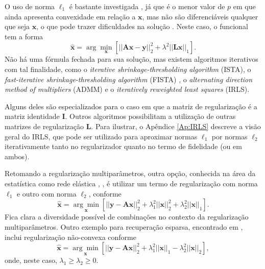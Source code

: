 O uso de norma $\ell_1$ é bastante investigada \cite[pág. 181]{aster2019parameter}, já que é o menor valor de $p$ em que ainda apresenta convexidade em relação a $\mathbf{x}$, mas não são diferenciáveis qualquer que seja $\mathbf{x}$, o que pode trazer dificuldades na solução \cite[pág. 46]{aster2019parameter}. Neste caso, o funcional tem a forma 
\begin{equation}
\hat{\mathbf{x}} = \arg\min\limits_{\mathbf{x}} \left[ \vert \vert \mathbf{A} \mathbf{x} - \mathbf{y} \vert \vert^2_2 + \lambda^2 \vert \vert \mathbf{L} \mathbf{x} \vert \vert_1 \right].
\label{eq:norma1}
\end{equation}
Não há uma fórmula fechada para sua solução, mas existem algoritmos iterativos com tal finalidade, como o \textit{iterative shrinkage-thresholding algorithm} (ISTA), o \textit{fast-iterative shrinkage-thresholding algorithm} (FISTA)   \cite{Daubechies2016}, o \textit{alternating direction method of multipliers} (ADMM) \cite[págs. 196-201]{aster2019parameter} e o \textit{iteratively reweighted least squares} (IRLS).

Alguns deles são especializados para o caso em que a matriz de regularização é a matriz identidade $\mathbf{I}$. Outros algoritmos possibilitam a utilização de outras matrizes de regularização $\mathbf{L}$. Para ilustrar, o Apêndice \ref{Ap:IRLS} descreve a visão geral do IRLS, que pode ser utilizado para aproximar normas $\ell_1$ por normas $\ell_2$ iterativamente tanto no regularizador quanto no termo de fidelidade (ou em ambos). 

Retomando a regularização multiparâmetros, outra opção, conhecida na área da estatística como rede elástica \cite[pág. 213]{majumdar2019compressed}, \cite{zou2005}, é utilizar um termo de regularização com norma $\ell_1$ e outro com norma $\ell_2$, conforme 
\begin{equation}
\hat{\mathbf{x}} = \underset{\mathbf{x}}{\arg\min}\left[ \vert \vert \mathbf{y} - \mathbf{A}\mathbf{x} \vert \vert^2_2+\lambda_{1}^2 \vert\vert \mathbf{x} \vert\vert^{2}_2+\lambda _{2}^2 \vert \vert \mathbf{x} \vert\vert_{1} \right].
\label{eq:elastic}
\end{equation} 
Fica clara a diversidade possível de combinações no contexto da regularização multiparâmetros. Outro exemplo para recuperação esparsa, encontrado em \cite{Ding2020}, inclui regularização não-convexa conforme  
\begin{equation}
\hat{\mathbf{x}} = \underset{\mathbf{x}}{\arg\min}\left[ \vert \vert \mathbf{y} - \mathbf{A}\mathbf{x} \vert \vert^2_2+\lambda_{1}^2 \vert\vert \mathbf{x} \vert\vert_{1} - \lambda _{2}^2 \vert \vert \mathbf{x} \vert\vert_{2} \right],
\label{eq:sparsl21}
\end{equation} 
onde, neste caso, $\lambda_{1}\geq\lambda_{2}\geq0$. 

